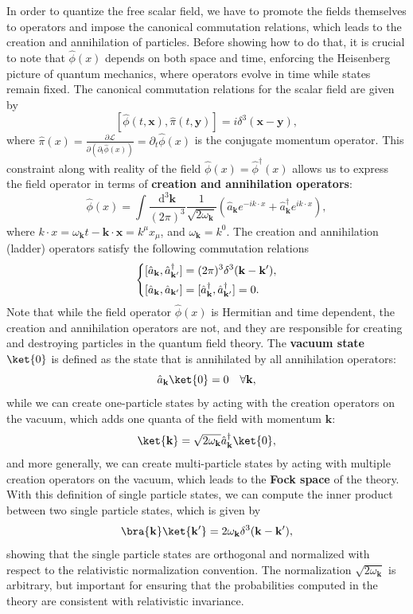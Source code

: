 In order to quantize the free scalar field, we have to promote the fields themselves to operators and impose the canonical commutation relations, which leads to the creation and annihilation of particles. Before showing how to do that, it is crucial to note that \(\hat{\phi}(x)\) depends on both space and time, enforcing the Heisenberg picture of quantum mechanics, where operators evolve in time while states remain fixed. The canonical commutation relations for the scalar field are given by
\[
    [\hat{\phi}(t, \mathbf{x}), \hat{\pi}(t, \mathbf{y})] = i \delta^3(\mathbf{x} - \mathbf{y}),
\]
where \(\hat{\pi}(x) = \frac{\partial \mathcal{L}}{\partial (\partial_t \hat{\phi}(x))} = \partial_t \hat{\phi}(x)\) is the conjugate momentum operator. This constraint along with reality of the field \(\hat{\phi}(x) = \hat{\phi}^\dagger(x)\) allows us to express the field operator in terms of \textbf{creation and annihilation operators}:
\[
    \hat{\phi}(x) = \int \frac{\mathrm{d}^3 \mathbf{k}}{(2\pi)^3} \frac{1}{\sqrt{2 \omega_{\mathbf{k}}}} \left( \hat{a}_{\mathbf{k}} e^{-i k \cdot x} + \hat{a}_{\mathbf{k}}^\dagger e^{i k \cdot x} \right),
\]
where \(k \cdot x = \omega_{\mathbf{k}} t - \mathbf{k} \cdot \mathbf{x} = k^{\mu} x_{\mu}\), and \(\omega_{\mathbf{k}} = k^0\). The creation and annihilation (ladder) operators satisfy the following commutation relations
\[
    \begin{dcases}
        [\hat{a}_{\mathbf{k}}, \hat{a}_{\mathbf{k}'}^\dagger] = (2\pi)^3 \delta^3(\mathbf{k} - \mathbf{k}'), \\
        [\hat{a}_{\mathbf{k}}, \hat{a}_{\mathbf{k}'}] = [\hat{a}_{\mathbf{k}}^\dagger, \hat{a}_{\mathbf{k}'}^\dagger] = 0.
    \end{dcases}
\]
Note that while the field operator \(\hat{\phi}(x)\) is Hermitian and time dependent, the creation and annihilation operators are not, and they are responsible for creating and destroying particles in the quantum field theory. The \textbf{vacuum state} \(\ket{0}\) is defined as the state that is annihilated by all annihilation operators:
\[
    \hat{a}_{\mathbf{k}} \ket{0} = 0 \quad \forall \mathbf{k},
\]
while we can create one-particle states by acting with the creation operators on the vacuum, which adds one quanta of the field with momentum \(\mathbf{k}\):
\[
    \ket{\mathbf{k}} = \sqrt{2 \omega_{\mathbf{k}}} \hat{a}_{\mathbf{k}}^\dagger \ket{0},
\]
and more generally, we can create multi-particle states by acting with multiple creation operators on the vacuum, which leads to the \textbf{Fock space} of the theory. With this definition of single particle states, we can compute the inner product between two single particle states, which is given by
\[
    \bra{\mathbf{k}} \ket{\mathbf{k}'} = 2 \omega_{\mathbf{k}} \delta^3(\mathbf{k} - \mathbf{k}'),
\]
showing that the single particle states are orthogonal and normalized with respect to the relativistic normalization convention. The normalization \(\sqrt{2 \omega_{\mathbf{k}}}\) is arbitrary, but important for ensuring that the probabilities computed in the theory are consistent with relativistic invariance.


